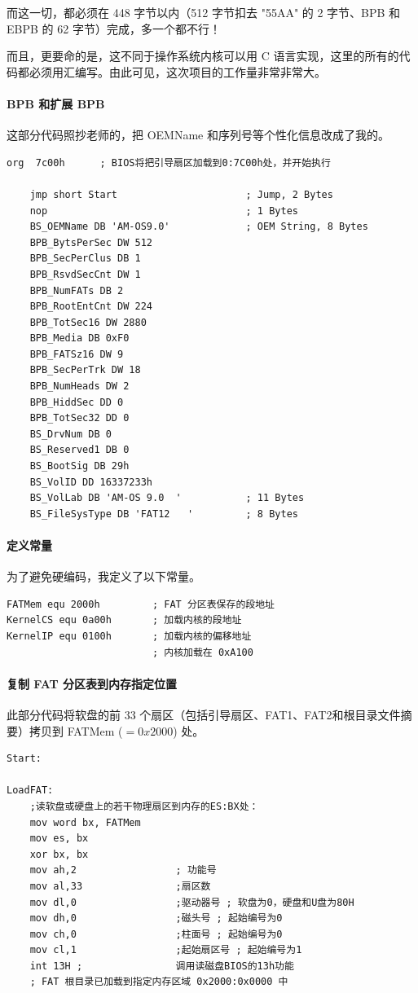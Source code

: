\documentclass[a4paper]{article}
\begin{document}
而这一切，都必须在 448 字节以内（512 字节扣去 "55AA" 的 2 字节、BPB 和 EBPB 的 62 字节）完成，多一个都不行！

而且，更要命的是，这不同于操作系统内核可以用 C 语言实现，这里的所有的代码都必须用汇编写。由此可见，这次项目的工作量非常非常大。

\paragraph{BPB 和扩展 BPB}

这部分代码照抄老师的，把 OEMName 和序列号等个性化信息改成了我的。

\begin{lstlisting}[language={[x86masm]Assembler}]
org  7c00h		; BIOS将把引导扇区加载到0:7C00h处，并开始执行

	jmp short Start                      ; Jump, 2 Bytes
	nop                                  ; 1 Bytes
	BS_OEMName DB 'AM-OS9.0'             ; OEM String, 8 Bytes
	BPB_BytsPerSec DW 512
	BPB_SecPerClus DB 1
	BPB_RsvdSecCnt DW 1
	BPB_NumFATs DB 2
	BPB_RootEntCnt DW 224
	BPB_TotSec16 DW 2880
	BPB_Media DB 0xF0
	BPB_FATSz16 DW 9
	BPB_SecPerTrk DW 18
	BPB_NumHeads DW 2
	BPB_HiddSec DD 0
	BPB_TotSec32 DD 0
	BS_DrvNum DB 0
	BS_Reserved1 DB 0
	BS_BootSig DB 29h
	BS_VolID DD 16337233h
	BS_VolLab DB 'AM-OS 9.0  '           ; 11 Bytes
	BS_FileSysType DB 'FAT12   '         ; 8 Bytes
\end{lstlisting}

\paragraph{定义常量}

为了避免硬编码，我定义了以下常量。

\begin{lstlisting}[language={[x86masm]Assembler}]
FATMem equ 2000h         ; FAT 分区表保存的段地址
KernelCS equ 0a00h       ; 加载内核的段地址
KernelIP equ 0100h       ; 加载内核的偏移地址
                         ; 内核加载在 0xA100
\end{lstlisting}

\paragraph{复制 FAT 分区表到内存指定位置}

此部分代码将软盘的前 33 个扇区（包括引导扇区、FAT1、FAT2和根目录文件摘要）拷贝到 FATMem ($= 0x2000$) 处。

\begin{lstlisting}[language={[x86masm]Assembler}]
Start:
                                       
LoadFAT:
	;读软盘或硬盘上的若干物理扇区到内存的ES:BX处：
	mov word bx, FATMem
	mov es, bx
	xor bx, bx
	mov ah,2                 ; 功能号
	mov al,33                ;扇区数
	mov dl,0                 ;驱动器号 ; 软盘为0，硬盘和U盘为80H
	mov dh,0                 ;磁头号 ; 起始编号为0
	mov ch,0                 ;柱面号 ; 起始编号为0
	mov cl,1                 ;起始扇区号 ; 起始编号为1
	int 13H ;                调用读磁盘BIOS的13h功能
	; FAT 根目录已加载到指定内存区域 0x2000:0x0000 中
\end{lstlisting}
\end{document}
